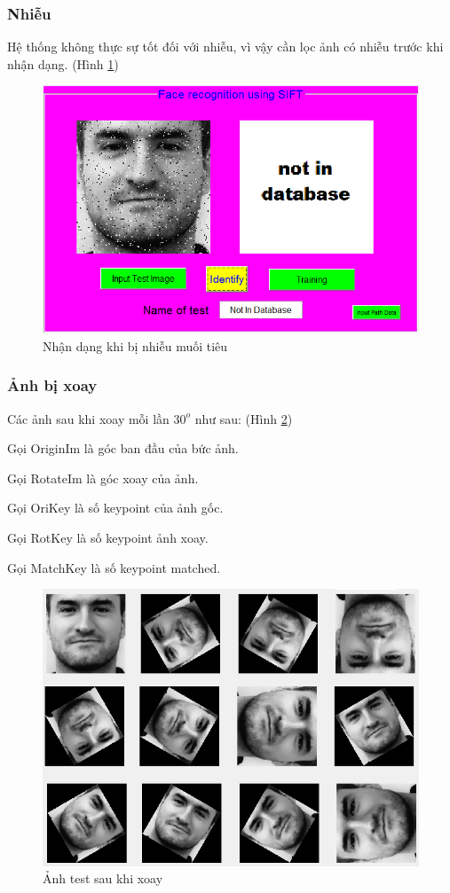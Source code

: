 \documentclass[conference]{IEEEtran}
\begin{document}
\subsubsection{Nhiễu}
Hệ thống không thực sự tốt đối với nhiễu, vì vậy cần lọc ảnh có nhiễu trước khi nhận dạng.
(Hình \ref{fig:bieudo7_tinh})
\begin{figure}
  \includegraphics[width=\linewidth]{bieudo7_tinh}
  \caption{Nhận dạng khi bị nhiễu muối tiêu}
  \label{fig:bieudo7_tinh}
\end{figure} 

\subsubsection{Ảnh bị xoay}
Các ảnh sau khi xoay mỗi lần $30^o$ như sau: (Hình \ref{fig:bieudo8_tinh})

Gọi OriginIm là góc ban đầu của bức ảnh. 

Gọi RotateIm là góc xoay của ảnh.

Gọi OriKey  là số keypoint của ảnh gốc.

Gọi RotKey là số keypoint ảnh xoay.

Gọi MatchKey là số keypoint matched.

\begin{figure}
  \includegraphics[width=\linewidth]{bieudo8_tinh}
  \caption{Ảnh test sau khi xoay}
  \label{fig:bieudo8_tinh}
\end{figure}
\end{document}
